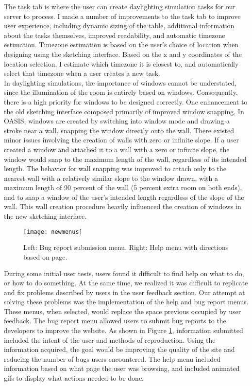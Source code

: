 The task tab is where the user can create daylighting simulation tasks for our server to process. I made a number of improvements to the task tab to improve user experience, including dynamic sizing of the table, additional information about the tasks themselves, improved readability, and automatic timezone estimation. Timezone estimation is based on the user's choice of location when designing using the sketching interface. Based on the x and y coordinates of the location selection, I estimate which timezone it is closest to, and automatically select that timezone when a user creates a new task. \\

In daylighting simulations, the importance of windows cannot be understated, since the illumination of the room is entirely based on windows. Consequently, there is a high priority for windows to be designed correctly. One enhancement to the old sketching interface composed primarily of improved window snapping. In OASIS, windows are created by switching into window mode and drawing a stroke near a wall, snapping the window directly onto the wall. There existed minor issues involving the creation of walls with zero or infinite slope. If a user created a window and attached it to a wall with a zero or infinite slope, the window would snap to the maximum length of the wall, regardless of its intended length. The behavior for wall snapping was improved to attach only to the nearest wall with a relatively similar slope to the window drawn, with a maximum length of 90 percent of the wall (5 percent extra room on both ends), and to snap a window of the user's intended length regardless of the slope of the wall. This wall creation procedure heavily influenced the creation of windows in the new sketching interface. \\

\begin{figure}[ht]
\centering
\texttt{[image: newmenus]}
\caption[OASIS bug report and help menu additions]{Left: Bug report submission menu. Right: Help menu with directions based on page.}
\label{fig:newmenus}
\end{figure}

During some initial user tests, users found it difficult to find help on what to do, or how to do something. At the same time, we realized it was difficult to replicate and fix problems described by users in the user feedback section. Our attempt at solving these problems was the implementation of the help and bug report menus. These menus, when selected, would replace the space previous occupied by user feedback. The bug report menu allowed users to submit bug reports to the developers to improve the website. As shown in Figure \ref{fig:newmenus}, information submitted included the intent of the user and methods of reproduction. Using the information acquired, the goal would be improving the quality of the site and reducing the number of bugs users encountered. The help menu included information based on what page the user was browsing, and included animated gifs to display what actions needed to be done.  \\

